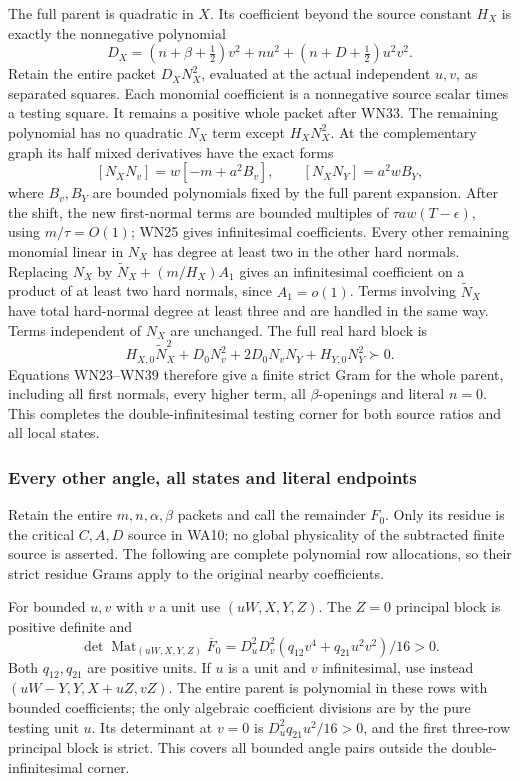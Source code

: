 The full parent is quadratic in \(X\). Its coefficient beyond
the source constant \(H_X\) is exactly the nonnegative polynomial
\[
 D_X=(n+\beta+\tfrac12)v^2+nu^2+
                         (n+D+\tfrac12)u^2v^2 .
 \tag{WN37}
\]
Retain the entire packet \(D_XN_X^2\), evaluated at the actual
independent \(u,v\), as separated squares. Each monomial coefficient
is a nonnegative source scalar times a testing square. It remains
a positive whole packet after WN33.
The remaining polynomial has no quadratic \(N_X\) term except
\(H_XN_X^2\). At the complementary graph its half mixed
derivatives have the exact forms
\[
 [N_XN_v]=w[-m+a^2B_v],\qquad
 [N_XN_Y]=a^2wB_Y,
 \tag{WN38}
\]
where \(B_v,B_Y\) are bounded polynomials fixed by the full
parent expansion. After the shift, the new first-normal terms
are bounded multiples of \(\tau aw(T-\epsilon)\), using
\(m/\tau=O(1)\); WN25 gives infinitesimal coefficients.
Every other remaining monomial linear in \(N_X\) has degree at
least two in the other hard normals. Replacing \(N_X\) by
\(\widetilde N_X+(m/H_X)A_1\) gives an infinitesimal coefficient
on a product of at least two hard normals, since \(A_1=o(1)\).
Terms involving \(\widetilde N_X\) have total hard-normal
degree at least three and are handled in the same way.
Terms independent of \(N_X\) are unchanged. The full real hard block is
\[
 H_{X,0}\widetilde N_X^2+
       D_0N_v^2+2D_0N_vN_Y+H_{Y,0}N_Y^2\succ0.
 \tag{WN39}
\]
Equations WN23--WN39 therefore give a finite strict Gram for
the whole parent, including all first normals, every higher term,
all \(\beta\)-openings and literal \(n=0\).
This completes the double-infinitesimal testing corner for both
source ratios and all local states.

\subsubsection*{Every other angle, all states and literal endpoints}

Retain the entire \(m,n,\alpha,\beta\) packets and call the
remainder \(F_0\). Only its residue is the critical \(C,A,D\)
source in WA10; no global physicality of the subtracted finite
source is asserted. The following are complete polynomial row
allocations, so their strict residue Grams apply to the original
nearby coefficients.

For bounded \(u,v\) with \(v\) a unit use \((uW,X,Y,Z)\).
The \(Z=0\) principal block is positive definite and
\[
 \det\operatorname{Mat}_{(uW,X,Y,Z)}\bar F_0
 =D_u^2D_v^2(q_{12}v^4+q_{21}u^2v^2)/16>0.
 \tag{WN40}
\]
Both \(q_{12},q_{21}\) are positive units. If \(u\) is a unit
and \(v\) infinitesimal, use instead
\((uW-Y,Y,X+uZ,vZ)\). The entire parent is polynomial in
these rows with bounded coefficients; the only algebraic
coefficient divisions are by the pure testing unit \(u\).
Its determinant at \(v=0\) is
\(D_u^2q_{21}u^2/16>0\), and the first three-row principal block
is strict. This covers all bounded angle pairs outside the
double-infinitesimal corner.

